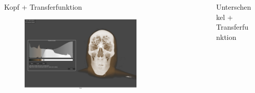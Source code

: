 \documentclass[final,hyperref={pdfpagelabels=false}]{beamer}
\begin{document}
\begin{frame}[t]
\begin{columns}[t] %

\begin{column}{.025\textwidth}\end{column} %

\begin{column}{.465\textwidth} %


\begin{block}{Kopf + Transferfunktion}
    \begin{figure}
    	\center
        \includegraphics[width=0.75\textwidth]{KopfTransferfunktion}
        
    \end{figure}

\end{block}


\end{column} %



\begin{column}{.025\textwidth}\end{column} %

\begin{column}{.465\textwidth}


\begin{block}{Unterschenkel + Transferfunktion}
  

\end{block}
\end{column}
\end{columns}
\end{frame}
\end{document}
